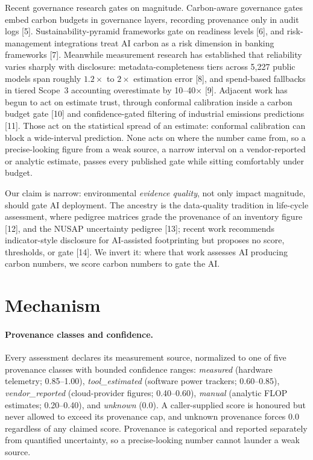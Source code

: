 \documentclass{article}
\begin{document}
Recent governance research gates on magnitude. Carbon-aware governance gates
embed carbon budgets in governance layers, recording provenance only in audit
logs [5]. Sustainability-pyramid frameworks gate on readiness levels [6], and
risk-management integrations treat AI carbon as a risk dimension in banking
frameworks [7]. Meanwhile measurement research has established that
reliability varies sharply with disclosure: metadata-completeness tiers across
5{,}227 public models span roughly $1.2\times$ to $2\times$ estimation error
[8], and spend-based fallbacks in tiered Scope~3 accounting overestimate by
10--40$\times$ [9]. Adjacent work has begun to act on estimate trust, through
conformal calibration inside a carbon budget gate [10] and confidence-gated
filtering of industrial emissions predictions [11]. Those act on the
statistical spread of an estimate: conformal calibration can block a
wide-interval prediction. None acts on where the number came from, so a
precise-looking figure from a weak source, a narrow interval on a
vendor-reported or analytic estimate, passes every published gate while
sitting comfortably under budget.

Our claim is narrow: environmental \emph{evidence quality}, not only impact
magnitude, should gate AI deployment. The ancestry is the data-quality
tradition in life-cycle assessment, where pedigree matrices grade the
provenance of an inventory figure [12], and the NUSAP uncertainty pedigree
[13]; recent work recommends indicator-style disclosure for AI-assisted
footprinting but proposes no score, thresholds, or gate [14]. We invert it:
where that work assesses AI producing carbon numbers, we score carbon numbers
to gate the AI.

\section{Mechanism}

\paragraph{Provenance classes and confidence.} Every assessment declares its
measurement source, normalized to one of five provenance classes with bounded
confidence ranges: \emph{measured} (hardware telemetry; 0.85--1.00),
\emph{tool\_estimated} (software power trackers; 0.60--0.85),
\emph{vendor\_reported} (cloud-provider figures; 0.40--0.60), \emph{manual}
(analytic FLOP estimates; 0.20--0.40), and \emph{unknown} (0.0). A
caller-supplied score is honoured but never allowed to exceed its provenance
cap, and unknown provenance forces 0.0 regardless of any claimed score.
Provenance is categorical and reported separately from quantified uncertainty,
so a precise-looking number cannot launder a weak source.
\end{document}
